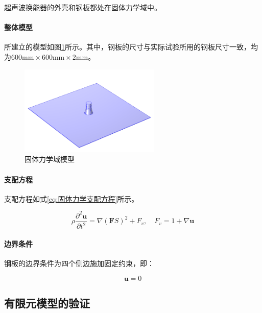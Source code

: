\documentclass[fontset=windows,12pt,a4paper,titlepage,UTF8]{ctexart}
\begin{document}
超声波换能器的外壳和钢板都处在固体力学域中。

\paragraph{整体模型}

所建立的模型如图\ref{pic:固体力学域模型}所示。其中，钢板的尺寸与实际试验所用的钢板尺寸一致，均为$600 \mathrm{mm} \times 600 \mathrm{mm} \times 2 \mathrm{mm}$。

\begin{figure}[h]
  \centering
  \includegraphics[width=0.6\textwidth]{assets/ultrasonic_transducer_plate_model.png}
  \caption{固体力学域模型}
  \label{pic:固体力学域模型}
\end{figure}

\paragraph{支配方程}

支配方程如式\eqref{eq:固体力学支配方程}所示。

\begin{equation}
  \rho \frac{\partial^2 \mathbf{u}}{\partial t^2} = \nabla (\mathbf{F}S)^2 + F_v, \quad F_v = 1 + \nabla \mathbf{u}
  \label{eq:固体力学支配方程}
\end{equation}

\paragraph{边界条件}

钢板的边界条件为四个侧边施加固定约束，即：

\begin{equation}
  \mathbf{u} = 0
  \label{eq:钢板边界条件}
\end{equation}

\subsection{有限元模型的验证}
\end{document}
